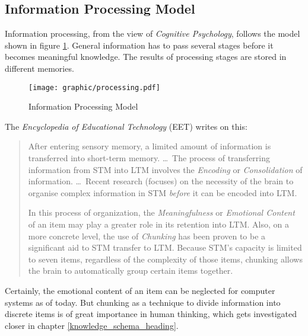 %
%
%
%
%
%
%

\subsection{Information Processing Model}
\label{information_processing_model_heading}

Information processing, from the view of \emph{Cognitive Psychology}, follows
the model shown in figure \ref{processing_figure}. General information has to
pass several stages before it becomes meaningful knowledge. The results of
processing stages are stored in different memories.

\begin{figure}[ht]
    \begin{center}
        \texttt{[image: graphic/processing.pdf]}
        \caption{Information Processing Model \cite{eet}}
        \label{processing_figure}
    \end{center}
\end{figure}

The \emph{Encyclopedia of Educational Technology} (EET) \cite{eet} writes on
this:

\begin{quote}
    After entering sensory memory, a limited amount of information is
    transferred into short-term memory. \ldots\ The process of transferring
    information from STM into LTM involves the \emph{Encoding} or
    \emph{Consolidation} of information. \ldots\ Recent research (focuses) on
    the necessity of the brain to organise complex information in STM
    \emph{before} it can be encoded into LTM.

    In this process of organization, the \emph{Meaningfulness} or
    \emph{Emotional Content} of an item may play a greater role in its
    retention into LTM. Also, on a more concrete level, the use of
    \emph{Chunking} has been proven to be a significant aid to STM transfer to
    LTM. Because STM's capacity is limited to seven items, regardless of the
    complexity of those items, chunking allows the brain to automatically group
    certain items together.
\end{quote}

Certainly, the emotional content of an item can be neglected for computer
systems as of today. But chunking as a technique to divide information into
discrete items is of great importance in human thinking, which gets
investigated closer in chapter \ref{knowledge_schema_heading}.
